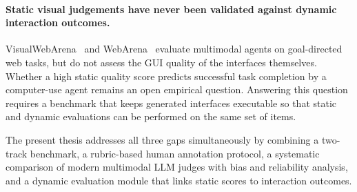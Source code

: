 \paragraph{Static visual judgements have never been validated against dynamic interaction outcomes.}
VisualWebArena~\cite{visualwebarena} and WebArena~\cite{webarena}
evaluate multimodal agents on goal-directed web tasks, but do not assess
the GUI quality of the interfaces themselves.
Whether a high static quality score predicts successful task completion
by a computer-use agent remains an open empirical question.
Answering this question requires a benchmark that keeps generated interfaces
executable so that static and dynamic evaluations can be performed on the
same set of items.

The present thesis addresses all three gaps simultaneously by combining
a two-track benchmark, a rubric-based human annotation protocol, a systematic
comparison of modern multimodal LLM judges with bias and reliability analysis,
and a dynamic evaluation module that links static scores to interaction outcomes.

